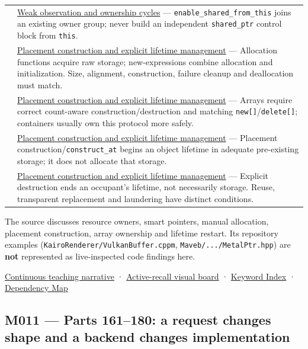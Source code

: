 {\begin{longtable}[]{@{}
  >{\raggedright\arraybackslash}p{}
  >{\raggedright\arraybackslash}p{}@{}}
156 & \hyperref[appendix-b9548675eb2b]{Weak observation and ownership cycles} --- \texttt{enable\_shared\_from\_this} joins an existing owner group; never build an independent \texttt{shared\_ptr} control block from \texttt{this}. \\
157 & \hyperref[appendix-f56c3e43fd4e]{Placement construction and explicit lifetime management} --- Allocation functions acquire raw storage; new-expressions combine allocation and initialization. Size, alignment, construction, failure cleanup and deallocation must match. \\
158 & \hyperref[appendix-f56c3e43fd4e]{Placement construction and explicit lifetime management} --- Arrays require correct count-aware construction/destruction and matching \texttt{new{[}{]}}/\texttt{delete{[}{]}}; containers usually own this protocol more safely. \\
159 & \hyperref[appendix-f56c3e43fd4e]{Placement construction and explicit lifetime management} --- Placement construction/\texttt{construct\_at} begins an object lifetime in adequate pre-existing storage; it does not allocate that storage. \\
160 & \hyperref[appendix-f56c3e43fd4e]{Placement construction and explicit lifetime management} --- Explicit destruction ends an occupant's lifetime, not necessarily storage. Reuse, transparent replacement and laundering have distinct conditions. \\
\end{longtable}
}

The source discusses resource owners, smart pointers, manual allocation, placement construction, array ownership and lifetime restart. Its repository examples (\texttt{KairoRenderer/VulkanBuffer.cppm}, \texttt{Maveb/.../MetalPtr.hpp}) are \textbf{not} represented as live-inspected code findings here.

\hyperref[01-foundations-i-ch004-from-a-live-object-to-responsible-resource-ownership]{Continuous teaching narrative} · \hyperref[appendix-960160274237]{Active-recall visual board} · \hyperref[appendix-a6d556a4ef50]{Keyword Index} · \hyperref[appendix-4ad47bdd269a]{Dependency Map}

\subsection{M011 --- Parts 161--180: a request changes shape and a backend changes implementation}\label{appendix-fd090d982a15-m011-parts-161180-a-request-changes-shape-and-a-backend-changes-implementation}

